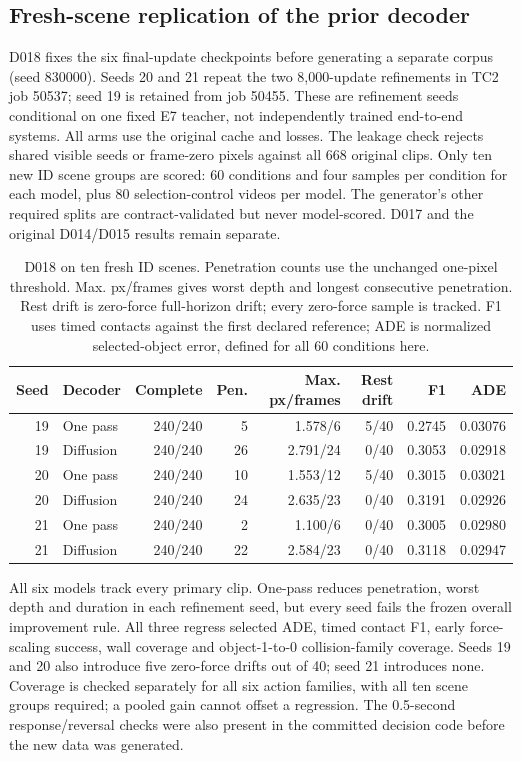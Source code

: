 \documentclass[11pt,a4paper]{article}
\begin{document}
\subsection{Fresh-scene replication of the prior decoder}
D018 fixes the six final-update checkpoints before generating a separate corpus
(seed 830000). Seeds 20 and 21 repeat the two 8,000-update refinements in TC2
job 50537; seed 19 is retained from job 50455. These are refinement seeds
conditional on one fixed E7 teacher, not independently trained end-to-end
systems. All arms use the original cache and losses. The leakage check rejects
shared visible seeds or frame-zero pixels against all 668 original clips.
Only ten new ID scene groups are scored: 60 conditions and four samples per
condition for each model, plus 80 selection-control videos per model.
The generator's other required splits are contract-validated but never model-scored.
D017 and the original D014/D015 results remain separate.

\begin{table}[!ht]
\centering
\small
\setlength{\tabcolsep}{4pt}
\begin{tabular}{rlrrrrrr}
\hline
Seed & Decoder & Complete & Pen. & Max. px/frames & Rest drift & F1 & ADE \\
\hline
19 & One pass & 240/240 & 5 & 1.578/6 & 5/40 & 0.2745 & 0.03076 \\
19 & Diffusion & 240/240 & 26 & 2.791/24 & 0/40 & 0.3053 & 0.02918 \\
20 & One pass & 240/240 & 10 & 1.553/12 & 5/40 & 0.3015 & 0.03021 \\
20 & Diffusion & 240/240 & 24 & 2.635/23 & 0/40 & 0.3191 & 0.02926 \\
21 & One pass & 240/240 & 2 & 1.100/6 & 0/40 & 0.3005 & 0.02980 \\
21 & Diffusion & 240/240 & 22 & 2.584/23 & 0/40 & 0.3118 & 0.02947 \\
\hline
\end{tabular}
\caption{D018 on ten fresh ID scenes. Penetration counts use the unchanged
one-pixel threshold. Max. px/frames gives worst depth and longest consecutive
penetration. Rest drift is zero-force full-horizon drift; every zero-force
sample is tracked. F1 uses timed contacts against the first declared reference;
ADE is normalized selected-object error, defined for all 60 conditions here.}
\label{tab:prior-replication}
\end{table}

All six models track every primary clip. One-pass reduces penetration, worst
depth and duration in each refinement seed, but every seed fails the frozen
overall improvement rule. All three regress selected ADE, timed contact F1,
early force-scaling success, wall coverage and object-1-to-0 collision-family
coverage. Seeds 19 and 20 also introduce five zero-force drifts out of 40;
seed 21 introduces none. Coverage is checked separately for all six action
families, with all ten scene groups required; a pooled gain cannot offset a
regression. The 0.5-second response/reversal checks were also present in the
committed decision code before the new data was generated.
\end{document}
